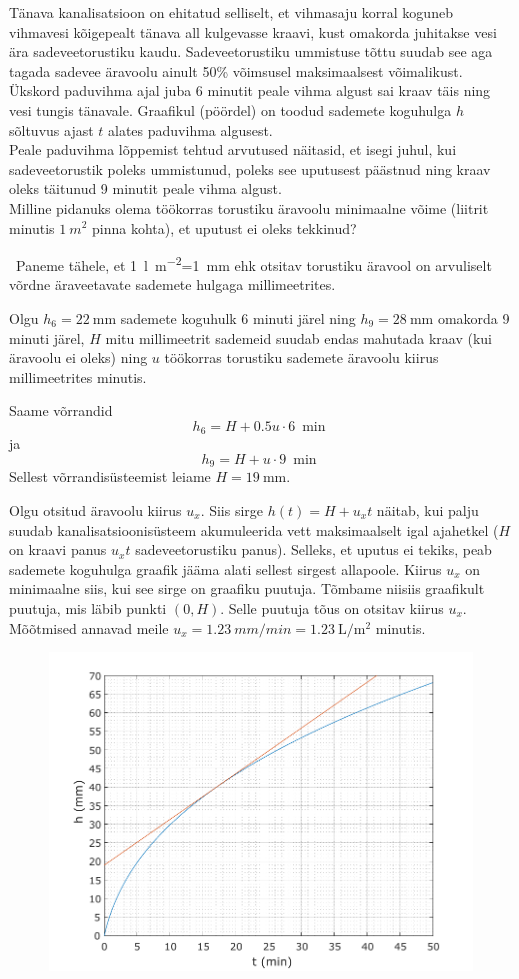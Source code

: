 
Tänava kanalisatsioon on ehitatud selliselt, et vihmasaju korral koguneb vihmavesi kõigepealt tänava all kulgevasse kraavi, kust omakorda juhitakse vesi ära sadeveetorustiku kaudu. Sadeveetorustiku ummistuse tõttu suudab see aga tagada sadevee äravoolu ainult 50\% võimsusel maksimaalsest võimalikust. Ükskord paduvihma ajal juba 6 minutit peale vihma algust sai kraav täis ning vesi tungis tänavale. Graafikul (pöördel) on toodud sademete koguhulga $h$ sõltuvus ajast $t$ alates paduvihma algusest. \\
Peale paduvihma lõppemist tehtud arvutused näitasid, et isegi juhul, kui sadeveetorustik poleks ummistunud, poleks see uputusest päästnud ning kraav oleks täitunud 9 minutit peale vihma algust.\\
Milline pidanuks olema töökorras torustiku äravoolu minimaalne võime (liitrit minutis $\SI{1} {m^2}$ pinna kohta), et uputust ei oleks tekkinud? 

\hint

\solu
\
Paneme tähele, et \SI{1}{l\per m^2}=\SI{1}{mm} ehk otsitav torustiku äravool on arvuliselt võrdne äraveetavate sademete hulgaga millimeetrites.

Olgu $h_6=\SI{22}{\mm}$ sademete koguhulk 6 minuti järel ning $h_9=\SI{28}{\mm}$ omakorda 9 minuti järel, $H$ mitu millimeetrit sademeid suudab endas mahutada kraav (kui äravoolu ei oleks) ning $u$ töökorras torustiku sademete äravoolu kiirus millimeetrites minutis.

Saame võrrandid
\[
h_6 = H +0.5 u \cdot \SI{6}{\min}
\]
ja
\[
h_9 = H + u \cdot \SI{9}{\min}
\]
Sellest võrrandisüsteemist leiame $H=\SI{19}{\mm}$.

Olgu otsitud äravoolu kiirus $u_x$. Siis sirge $h(t)=H+u_xt$ näitab, kui palju suudab kanalisatsioonisüsteem akumuleerida vett maksimaalselt igal ajahetkel ($H$ on kraavi panus $u_xt$ sadeveetorustiku panus). Selleks, et uputus ei tekiks, peab sademete koguhulga graafik jääma alati sellest sirgest allapoole. Kiirus $u_x$ on minimaalne siis, kui see sirge on graafiku puutuja. Tõmbame niisiis graafikult puutuja, mis läbib punkti $(0,H)$. Selle puutuja tõus on otsitav kiirus $u_x$. Mõõtmised annavad meile $u_x=\SI{1.23}{mm/min}=\SI{1.23}{\L\per\m\squared}$ minutis.

\begin{figure}[h]
	\vspace{-1em}
    \centering
    \includegraphics[width=0.75\linewidth]{2022-v3g-07-sol.pdf}
\end{figure}
\probend